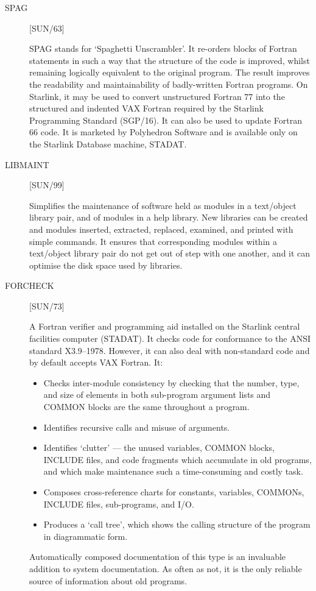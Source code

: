 \begin{description}

\item [SPAG] \hfill [SUN/63]

SPAG stands for `Spaghetti Unscrambler'.
It re-orders blocks of Fortran statements in such a way that the structure of
the code is improved, whilst remaining logically equivalent to the original
program. 
The result improves the readability and maintainability of badly-written
Fortran programs.
On Starlink, it may be used to convert unstructured Fortran 77 into the
structured and indented VAX Fortran required by the Starlink Programming
Standard (SGP/16). 
It can also be used to update Fortran 66 code.
It is marketed by Polyhedron Software and is available only on the Starlink
Database machine, STADAT.

\item [LIBMAINT] \hfill [SUN/99]

Simplifies the maintenance of software held as modules in a
text/object library pair, and of modules in a help library.
New libraries can be created and modules inserted, extracted, replaced,
examined, and printed with simple commands.
It ensures that corresponding modules within a text/object library pair do not
get out of step with one another, and it can optimise the disk space used by
libraries.

\item [FORCHECK] \hfill [SUN/73]

A Fortran verifier and programming aid installed on the Starlink central
facilities computer (STADAT).
It checks code for conformance to the ANSI standard X3.9--1978.
However, it can also deal with non-standard code and by default accepts VAX
Fortran.
It:
\begin{itemize}
\item Checks inter-module consistency by checking that the number, type, and
 size of elements in both sub-program argument lists and COMMON blocks are the
 same throughout a program.
\item Identifies recursive calls and misuse of arguments.
\item Identifies `clutter' --- the unused variables, COMMON blocks, INCLUDE
 files, and code fragments which accumulate in old programs, and which make
 maintenance such a time-consuming and costly task.
\item Composes cross-reference charts for constants, variables, COMMONs,
 INCLUDE files, sub-programs, and I/O.
\item Produces a `call tree', which shows the calling structure of the program
 in diagrammatic form.
\end{itemize}
Automatically composed documentation of this type is an invaluable addition
to system documentation.
As often as not, it is the only reliable source of information about old
programs.


\end{description}

